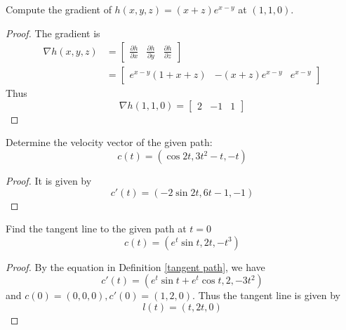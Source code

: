 \documentclass[openany]{book}
\begin{document}
\begin{prob}
    Compute the gradient of $h(x,y,z)=(x+z)e^{x-y}$ at $(1,1,0)$.
\end{prob}
\begin{proof}
    The gradient is 
    \begin{align*}
        \nabla h(x,y,z)&=\begin{bmatrix}
            \frac{\partial h}{\partial x}&\frac{\partial h}{\partial y}&\frac{\partial h}{\partial z}
        \end{bmatrix}\\
        &=\begin{bmatrix}
            e^{x-y}(1+x+z)&-(x+z)e^{x-y}&e^{x-y}
        \end{bmatrix}
    \end{align*}
    Thus 
    \begin{equation*}
        \nabla h(1,1,0)=\begin{bmatrix}
            2&-1&1
        \end{bmatrix}
    \end{equation*}
\end{proof}





\begin{prob}
    Determine the velocity vector of the given path:
    \begin{equation*}
        c(t)=(\cos 2t, 3t^2-t, -t)
    \end{equation*}
\end{prob}
\begin{proof}
    It is given by 
    \begin{equation*}
        c'(t)=(-2\sin 2t, 6t-1, -1)
    \end{equation*}
\end{proof}


\begin{prob}
    Find the tangent line to the given path at $t=0$
    \begin{equation*}
        c(t)=(e^t\sin t, 2t, -t^3)
    \end{equation*}
\end{prob}
\begin{proof}
    By the equation in Definition \ref{tangent path}, we have 
    \begin{equation*}
        c'(t)=(e^t\sin t+e^t\cos t, 2, -3t^2)
    \end{equation*}
    and $c(0)=(0,0,0), c'(0)=(1,2,0)$. Thus the tangent line is given by 
    \begin{equation*}
        l(t)=(t,2t,0)
    \end{equation*}
\end{proof}
\end{document}

